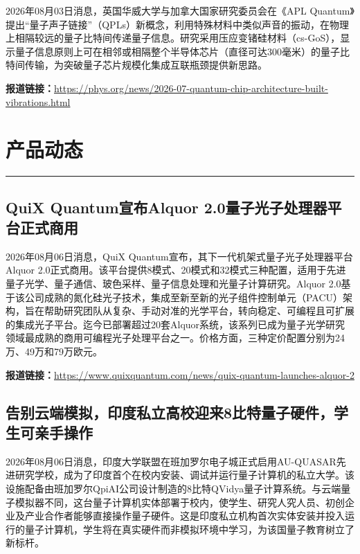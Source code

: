 \documentclass[12pt,a4paper]{ctexart}
\begin{document}
2026年08月03日消息，英国华威大学与加拿大国家研究委员会在《APL Quantum》提出“量子声子链接”（QPLs）新概念，利用特殊材料中类似声音的振动，在物理上相隔较远的量子比特间传递量子信息。研究采用压应变锗硅材料（cs-GoS），显示量子信息原则上可在相邻或相隔整个半导体芯片（直径可达300毫米）的量子比特间传输，为突破量子芯片规模化集成互联瓶颈提供新思路。

\noindent\textbf{报道链接：}\url{https://phys.org/news/2026-07-quantum-chip-architecture-built-vibrations.html}


\newpage
\section{产品动态}
\vspace{-0.5em}
\noindent\rule{\linewidth}{1.5pt}

\subsection{ QuiX Quantum宣布Alquor 2.0量子光子处理器平台正式商用 }

2026年08月06日消息，QuiX Quantum宣布，其下一代机架式量子光子处理器平台Alquor 2.0正式商用。该平台提供8模式、20模式和32模式三种配置，适用于先进量子光学、量子通信、玻色采样、量子信息处理和光量子计算研究。Alquor 2.0基于该公司成熟的氮化硅光子技术，集成至新至新的光子组件控制单元（PACU）架构，旨在帮助研究团队从复杂、手动对准的光学平台，转向稳定、可编程且可扩展的集成光子平台。迄今已部署超过20套Alquor系统，该系列已成为量子光学研究领域最成熟的商用可编程光子处理平台之一。价格方面，三种定价配置分别为24万、49万和79万欧元。

\noindent\textbf{报道链接：}\url{https://www.quixquantum.com/news/quix-quantum-launches-alquor-2}

\subsection{ 告别云端模拟，印度私立高校迎来8比特量子硬件，学生可亲手操作 }

2026年08月06日消息，印度大学联盟在班加罗尔电子城正式启用AU-QUASAR先进研究学校，成为了印度首个在校内安装、调试并运行量子计算机的私立大学。该设施配备由班加罗尔QpiAI公司设计制造的8比特QVidya量子计算系统。与云端量子模拟器不同，这台量子计算机实体部署于校内，使学生、研究人究人员、初创企业及产业合作者能够直接操作量子硬件。这是印度私立机构首次实体安装并投入运行的量子计算机，学生将在真实硬件而非模拟环境中学习，为该国量子教育树立了新标杆。
\end{document}
